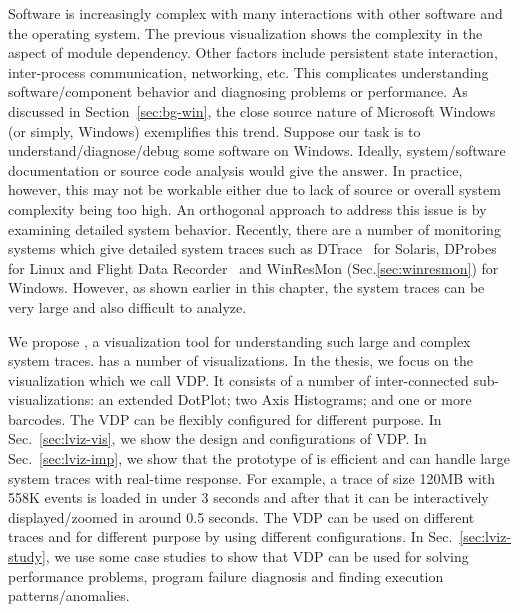 
Software is increasingly complex with many interactions with other software
and the operating system.
The previous visualization shows the complexity in the
aspect of module dependency.
Other factors include persistent state interaction, inter-process communication,
networking, etc.
This complicates understanding software/component behavior and diagnosing
problems or performance.
As discussed in Section~\ref{sec:bg-win},
the close source nature of Microsoft Windows (or simply, Windows)
exemplifies this trend.
Suppose our task is to understand/diagnose/debug some software on Windows.
Ideally, system/software documentation or source code
analysis would give the answer.
In practice, however, this may not be
workable either due to lack of source or overall
system complexity being too high.
An orthogonal approach to address this issue is by examining
detailed system behavior.
Recently, there are a number of monitoring systems which
give detailed system traces such as DTrace~\cite{cantrill2004dynamic} for Solaris,
DProbes for Linux and Flight Data Recorder~\cite{verbowski6flight}
and WinResMon (Sec.\ref{sec:winresmon}) for Windows.
However, as shown earlier in this chapter,
the system traces can be very large and also
difficult to analyze.

We propose , a visualization tool for
understanding such large and complex system traces.
 has a number of visualizations.
In the thesis, we focus on the visualization which we call VDP.
It consists of a number of inter-connected sub-visualizations:
an extended DotPlot;
two Axis Histograms; and one or more barcodes.
The VDP can be flexibly configured for different purpose.
In Sec.~\ref{sec:lviz-vis}, we show the design and configurations of VDP.
In Sec.~\ref{sec:lviz-imp}, we show that
the prototype of  is efficient and can handle large system traces
with real-time response. For example, a trace of size 120MB with 558K events 
is loaded in under 3 seconds
and after that it can be interactively displayed/zoomed in around 0.5 seconds.
The VDP can be used on different traces and for different purpose
by using different configurations.
In Sec.~\ref{sec:lviz-study}, we use some case studies to show that
VDP can be used for solving performance problems,
program failure diagnosis and finding execution patterns/anomalies.

